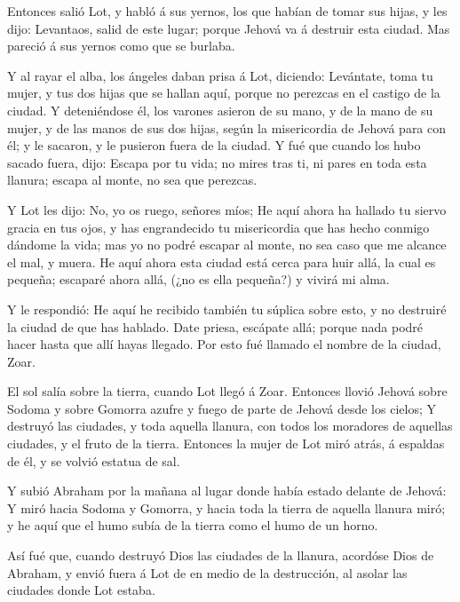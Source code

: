  Entonces salió Lot, y habló á sus yernos, los que habían
de tomar sus hijas, y les dijo: Levantaos, salid de este lugar; porque
Jehová va á destruir esta ciudad. Mas pareció á sus yernos como que se
burlaba.

 Y al rayar el alba, los ángeles daban prisa á Lot,
diciendo: Levántate, toma tu mujer, y tus dos hijas que se hallan aquí,
porque no perezcas en el castigo de la ciudad.  Y
deteniéndose él, los varones asieron de su mano, y de la mano de su
mujer, y de las manos de sus dos hijas, según la misericordia de Jehová
para con él; y le sacaron, y le pusieron fuera de la ciudad.
 Y fué que cuando los hubo sacado fuera, dijo: Escapa por
tu vida; no mires tras ti, ni pares en toda esta llanura; escapa al
monte, no sea que perezcas.

 Y Lot les dijo: No, yo os ruego, señores míos;
 He aquí ahora ha hallado tu siervo gracia en tus ojos, y
has engrandecido tu misericordia que has hecho conmigo dándome la vida;
mas yo no podré escapar al monte, no sea caso que me alcance el mal, y
muera.  He aquí ahora esta ciudad está cerca para huir
allá, la cual es pequeña; escaparé ahora allá, (¿no es ella pequeña?) y
vivirá mi alma.

 Y le respondió: He aquí he recibido también tu súplica
sobre esto, y no destruiré la ciudad de que has hablado. 
Date priesa, escápate allá; porque nada podré hacer hasta que allí hayas
llegado. Por esto fué llamado el nombre de la ciudad, Zoar.

 El sol salía sobre la tierra, cuando Lot llegó á Zoar.
 Entonces llovió Jehová sobre Sodoma y sobre Gomorra azufre
y fuego de parte de Jehová desde los cielos;  Y destruyó
las ciudades, y toda aquella llanura, con todos los moradores de
aquellas ciudades, y el fruto de la tierra.  Entonces la
mujer de Lot miró atrás, á espaldas de él, y se volvió estatua de sal.

 Y subió Abraham por la mañana al lugar donde había estado
delante de Jehová:  Y miró hacia Sodoma y Gomorra, y hacia
toda la tierra de aquella llanura miró; y he aquí que el humo subía de
la tierra como el humo de un horno.

 Así fué que, cuando destruyó Dios las ciudades de la
llanura, acordóse Dios de Abraham, y envió fuera á Lot de en medio de la
destrucción, al asolar las ciudades donde Lot estaba.

